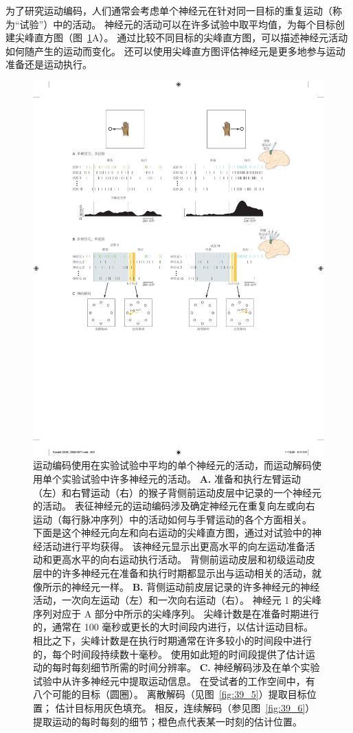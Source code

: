 为了研究运动编码，人们通常会考虑单个神经元在针对同一目标的重复运动（称为“试验”）中的活动。
神经元的活动可以在许多试验中取平均值，为每个目标创建尖峰直方图（图~\ref{fig:39_3}A）。
通过比较不同目标的尖峰直方图，可以描述神经元活动如何随产生的运动而变化。
还可以使用尖峰直方图评估神经元是更多地参与运动准备还是运动执行。


\begin{figure}[htbp]
	\centering
	\includegraphics[width=1.0\linewidth]{chap39/fig_39_3}
	\caption{运动编码使用在实验试验中平均的单个神经元的活动，而运动解码使用单个实验试验中许多神经元的活动。
		\textbf{A.} 准备和执行左臂运动（左）和右臂运动（右）的猴子背侧前运动皮层中记录的一个神经元的活动。
		表征神经元的运动编码涉及确定神经元在重复向左或向右运动（每行脉冲序列）中的活动如何与手臂运动的各个方面相关。
		下面是这个神经元向左和向右运动的尖峰直方图，通过对试验中的神经活动进行平均获得。
		该神经元显示出更高水平的向左运动准备活动和更高水平的向右运动执行活动。
		背侧前运动皮层和初级运动皮层中的许多神经元在准备和执行时期都显示出与运动相关的活动，就像所示的神经元一样。
		\textbf{B.} 背侧运动前皮层记录的许多神经元的神经活动，一次向左运动（左）和一次向右运动（右）。
		神经元 1 的尖峰序列对应于 A 部分中所示的尖峰序列。
		尖峰计数是在准备时期进行的，通常在 100 毫秒或更长的大时间段内进行，以估计运动目标。
		相比之下，尖峰计数是在执行时期通常在许多较小的时间段中进行的，每个时间段持续数十毫秒。
		使用如此短的时间段提供了估计运动的每时每刻细节所需的时间分辨率。
		\textbf{C.} 神经解码涉及在单个实验试验中从许多神经元中提取运动信息。 在受试者的工作空间中，有八个可能的目标（圆圈）。
		离散解码（见图~\ref{fig:39_5}）提取目标位置； 估计目标用灰色填充。
		相反，连续解码（参见图~\ref{fig:39_6}）提取运动的每时每刻的细节；橙色点代表某一时刻的估计位置。}
	\label{fig:39_3}
\end{figure}
